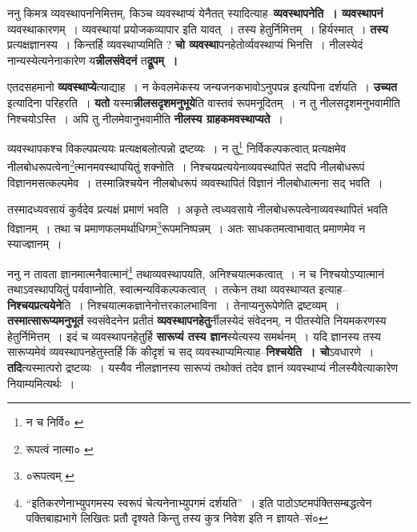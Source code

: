\documentclass[article,12pt,a4paper]{memoir}
\begin{document}
	  \pstart ननु किमत्र व्यवस्थापननिमित्तम्, किञ्च व्यवस्थाप्यं येनैतत् स्यादित्याह--\textbf{व्यवस्थापनेति । व्यवस्थापनं} व्यवस्थाकारणम् । व्यवस्थायां प्रयोजकव्यापार इति यावत् । तस्य हेतुर्निमित्तम् । हिर्यस्मात् । \textbf{तस्य} प्रत्यक्षज्ञानस्य । किन्तर्हि व्यवस्थाप्यमिति ? \textbf{चो व्यवस्था}पनहेतोर्व्यवस्थाप्यं भिनत्ति । नीलस्येदं नान्यस्येत्यनेनाकारेण य\textbf{न्नीलसंवेदनं} त\textbf{द्रूपम् ।}
	\pend
      

	  \pstart एतदसहमानो \textbf{व्यवस्थाप्ये}त्याद्याह । न केवलमेकस्य जन्यजनकभावोऽनुपपन्न इत्यपिना दर्शयति । \textbf{उच्यत} इत्यादिना परिहरति । \textbf{यतो} यस्मा\textbf{न्नीलसदृशमनुभूये}ति वास्तवं रूपमनूदितम् । न तु नीलसदृशमनुभवामीति निश्चयोऽस्ति । अपि तु नीलमेवानुभवामीति \textbf{नीलस्य ग्राहकमवस्थाप्यते} ।
	\pend
      \leavevmode{}
	  \bigskip
	  \begingroup
	

	  \pstart व्यवस्थापकश्च विकल्पप्रत्ययः प्रत्यक्षबलोत्पन्नो द्रष्टव्यः । न तु\footnote{न च निर्वि० \cite{dp-msC}} निर्विकल्पकत्वात् प्रत्यक्षमेव नीलबोधरूपत्वेना\footnote{रूपत्वं नात्मा० \cite{dp-msC}}त्मानमवस्थापयितुं शक्नोति । निश्चयप्रत्ययेनाव्यवस्थापितं सदपि नीलबोधरूपं विज्ञानमसत्कल्पमेव । तस्मान्निश्चयेन नीलबोधरूपं व्यवस्थापितं विज्ञानं नीलबोधात्मना सद् भवति ।
	\pend
       

	  \pstart तस्मादध्यवसायं कुर्वदेव प्रत्यक्षं प्रमाणं भवति । अकृते त्वध्यवसाये नीलबोधरूपत्वेनाव्यवस्थापितं भवति विज्ञानम् । तथा च प्रमाणफलमर्थाधिगम\footnote{०रूपत्वम् \cite{dp-msA} \cite{dp-msC} \cite{dp-msD} \cite{dp-edP} \cite{dp-edH} \cite{dp-edE}}रूपमनिष्पन्नम् । अतः साधकतमत्वाभावात् प्रमाणमेव न स्याज्ज्ञानम् ।
	\pend
      
	  \endgroup
	

	  \pstart ननु न तावता ज्ञानमात्मनैवात्मानं\footnote{“इतिकरणेनाभ्युपगमस्य स्वरूपं चेत्यनेनाभ्युपगमं दर्शयति” । इति पाठोऽष्टमपंक्तिसम्बद्धत्वेन पक्तिबाह्यभागे लिखितः प्रतौ दृश्यते किन्तु तस्य कुत्र निवेश इति न ज्ञायते--सं०} तथा\leavevmode{}व्यवस्थापयति, अनिश्चयात्मकत्वात् । न च निश्चयोऽप्यात्मानं तथाऽवस्थापयितुं पर्यवाप्नोति, स्वात्मन्यविकल्पकत्वात् । तत्केन तथा व्यवस्थाप्यत इत्याह--\textbf{निश्चयप्रत्ययेने}ति । निश्चयात्मकज्ञानेनोत्तरकालभाविना । तेनाप्यनुरूपेणेति द्रष्टव्यम् । \textbf{तस्मात्सारूप्यमनुभूतं} स्वसंवेदनेन प्रतीतं \textbf{व्यवस्थापनहेतु}र्नीलस्येदं संवेदनम्, न पीतस्येति नियमकरणस्य हेतुर्निमित्तम् । इदं च व्यवस्थापनहेतुर्हि \textbf{सारूप्यं तस्य ज्ञान}स्येत्यस्य समर्थनम् । यदि ज्ञानस्य तस्य सारूप्यमेवं व्यवस्थापनहेतुस्तर्हि किं कीदृशं च सद् व्यवस्थाप्यमित्याह--\textbf{निश्चयेति । चो}ऽवधारणे । \textbf{तदि}त्यस्मात्परो द्रष्टव्यः । यस्यैव नीलज्ञानस्य सारूप्यं तथोक्तं तदेव ज्ञानं व्यवस्थाप्यं नीलस्यैवेत्याकारेण नियाम्यमित्यर्थः ।
	\pend
      
\end{document}

